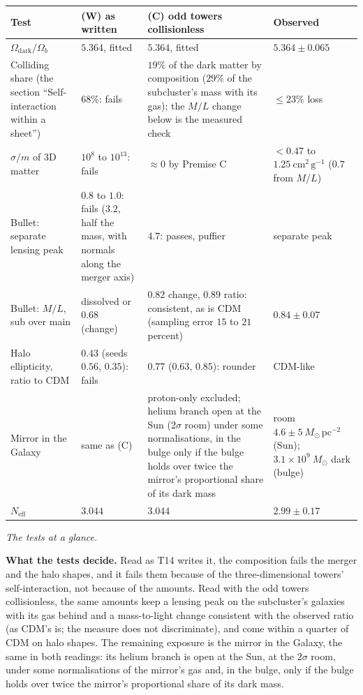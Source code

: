 \documentclass[11pt]{article}
\theoremstyle{definition}
\theoremstyle{plain}
\providecommand{\Msun}{}\renewcommand{\Msun}{M_{\odot}}
\providecommand{\cmg}{}\renewcommand{\cmg}{\mathrm{cm^{2}\,g^{-1}}}
\begin{document}
\label{c:note.simulations.setting-what-tests-decide-what-they}
\centering \begin{tabular}{@{}>{ \arraybackslash}p{}>{ \arraybackslash}p{}>{ \arraybackslash}p{}>{ \arraybackslash}p{}@{}}
\toprule
Test & (W) as written & (C) odd towers collisionless & Observed \\
\midrule
$\Omega_{\mathrm{dark}}/\Omega_{b}$ & $5.364$, fitted & $5.364$, fitted & $5.364 \pm 0.065$ \\
Colliding share (the section ``Self-interaction within a sheet'') & $68\%$: fails & $19\%$ of the dark matter by composition ($29\%$ of the subcluster's mass with its gas); the $M/L$ change below is the measured check & $\le 23\%$ loss \\
$\sigma/m$ of 3D matter & $10^{8}$ to $10^{13}$: fails & $\approx 0$ by Premise C & $< 0.47$ to $1.25\ \cmg$ ($0.7$ from $M/L$) \\
Bullet: separate lensing peak & $0.8$ to $1.0$: fails ($3.2$, half the mass, with normals along the merger axis) & $4.7$: passes, puffier & separate peak \\
Bullet: $M/L$, sub over main & dissolved or $0.68$ (change) & $0.82$ change, $0.89$ ratio: consistent, as is CDM (sampling error $15$ to $21$ percent) & $0.84 \pm 0.07$ \\
Halo ellipticity, ratio to CDM & $0.43$ (seeds $0.56$, $0.35$): fails & $0.77$ ($0.63$, $0.85$): rounder & CDM-like \\
Mirror in the Galaxy & same as (C) & proton-only excluded; helium branch open at the Sun ($2\sigma$ room) under some normalisations, in the bulge only if the bulge holds over twice the mirror's proportional share of its dark mass & room $4.6 \pm 5\ \Msun\,\mathrm{pc^{-2}}$ (Sun); $3.1 \times 10^{9}\ \Msun$ dark (bulge) \\
$N_{\mathrm{eff}}$ & $3.044$ & $3.044$ & $2.99 \pm 0.17$ \\
\bottomrule
\end{tabular}

\emph{The tests at a glance.}

\label{c:note.simulations.setting-what-tests-decide-what-they-2}
\textbf{What the tests decide.} Read as T14 writes it, the composition fails the merger and the halo shapes, and it fails them because of the three-dimensional towers' self-interaction, not because of the amounts. Read with the odd towers collisionless, the same amounts keep a lensing peak on the subcluster's galaxies with its gas behind and a mass-to-light change consistent with the observed ratio (as CDM's is; the measure does not discriminate), and come within a quarter of CDM on halo shapes. The remaining exposure is the mirror in the Galaxy, the same in both readings: its helium branch is open at the Sun, at the $2\sigma$ room, under some normalisations of the mirror's gas and, in the bulge, only if the bulge holds over twice the mirror's proportional share of its dark mass.
\end{document}
